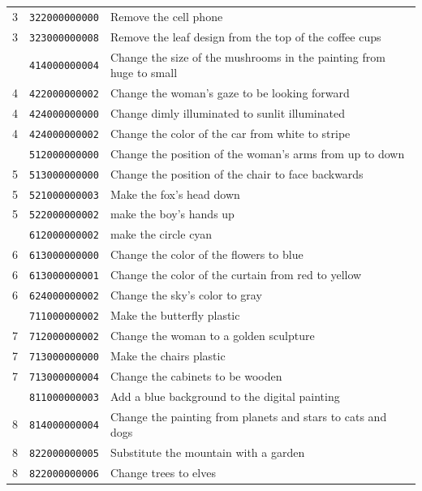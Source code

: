\begin{table}[!t]
\begin{minipage}{6.9in}
\begin{tabularx}{\linewidth}{@{}c l >{\raggedright\arraybackslash}X@{}}
3 & \texttt{322000000000} & Remove the cell phone \\
3 & \texttt{323000000008} & Remove the leaf design from the top of the coffee cups \\
\addlinespace[1pt]
4 & \texttt{414000000004} & Change the size of the mushrooms in the painting from huge to small \\
4 & \texttt{422000000002} & Change the woman's gaze to be looking forward \\
4 & \texttt{424000000000} & Change dimly illuminated to sunlit illuminated \\
4 & \texttt{424000000002} & Change the color of the car from white to stripe \\
\addlinespace[1pt]
5 & \texttt{512000000000} & Change the position of the woman's arms from up to down \\
5 & \texttt{513000000000} & Change the position of the chair to face backwards \\
5 & \texttt{521000000003} & Make the fox's head down \\
5 & \texttt{522000000002} & make the boy's hands up \\
\addlinespace[1pt]
6 & \texttt{612000000002} & make the circle cyan \\
6 & \texttt{613000000000} & Change the color of the flowers to blue \\
6 & \texttt{613000000001} & Change the color of the curtain from red to yellow \\
6 & \texttt{624000000002} & Change the sky's color to gray \\
\addlinespace[1pt]
7 & \texttt{711000000002} & Make the butterfly plastic \\
7 & \texttt{712000000002} & Change the woman to a golden sculpture \\
7 & \texttt{713000000000} & Make the chairs plastic \\
7 & \texttt{713000000004} & Change the cabinets to be wooden \\
\addlinespace[1pt]
8 & \texttt{811000000003} & Add a blue background to the digital painting \\
8 & \texttt{814000000004} & Change the painting from planets and stars to cats and dogs \\
8 & \texttt{822000000005} & Substitute the mountain with a garden \\
8 & \texttt{822000000006} & Change trees to elves \\
\bottomrule
\end{tabularx}
\par\smallskip

\end{minipage}
\end{table}
